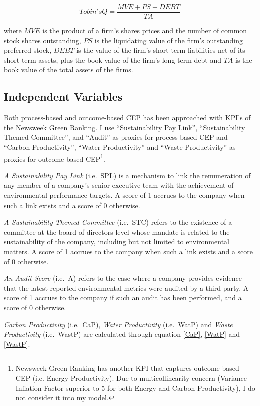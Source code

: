 \documentclass[12pt,]{article}
\let\rmarkdownfootnote\footnote%
\def\footnote{\protect\rmarkdownfootnote}
\begin{document}
\begin{equation}
Tobin's Q = \frac{MVE + PS + DEBT}{TA}
\label{Chung}
\end{equation}

where \(MVE\) is the product of a firm's shares prices and the number of
common stock shares outstanding, \(PS\) is the liquidating value of the
firm's outstanding preferred stock, \(DEBT\) is the value of the firm's
short-term liabilities net of its short-term assets, plus the book value
of the firm's long-term debt and \(TA\) is the book value of the total
assets of the firms.

\subsection{Independent Variables}\label{independent-variables}

Both process-based and outcome-based CEP has been approached with KPI's
of the Newsweek Green Ranking. I use ``Sustainability Pay Link'',
``Sustainability Themed Committee'', and ``Audit'' as proxies for
process-based CEP and ``Carbon Productivity'', ``Water Productivity''
and ``Waste Productivity'' as proxies for outcome-based
CEP\footnote{Newsweek Green Ranking has another KPI that captures outcome-based CEP (i.e. Energy Productivity). Due to multicollinearity concern (Variance Inflation Factor superior to 5 for both Energy and Carbon Productivity),  I do not consider it into my model.}.

\emph{A Sustainability Pay Link} (i.e.~SPL) is a mechanism to link the
remuneration of any member of a company's senior executive team with the
achievement of environmental performance targets. A score of 1 accrues
to the company when such a link exists and a score of 0 otherwise.

\emph{A Sustainability Themed Committee} (i.e.~STC) refers to the
existence of a committee at the board of directors level whose mandate
is related to the sustainability of the company, including but not
limited to environmental matters. A score of 1 accrues to the company
when such a link exists and a score of 0 otherwise.

\emph{An Audit Score} (i.e.~A) refers to the case where a company
provides evidence that the latest reported environmental metrics were
audited by a third party. A score of 1 accrues to the company if such an
audit has been performed, and a score of 0 otherwise.

\emph{Carbon Productivity} (i.e.~CaP), \emph{Water Productivity}
(i.e.~WatP) and \emph{Waste Productivity} (i.e.~WastP) are calculated
through equation \ref{CaP}, \ref{WatP} and \ref{WastP}.
\end{document}
